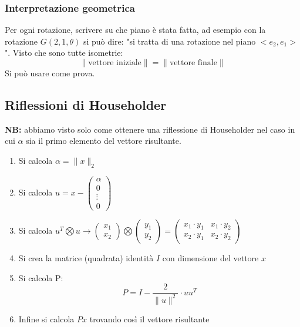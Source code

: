 \documentclass[10pt]{article}
\begin{document}
\subsubsection{Interpretazione geometrica}
Per ogni rotazione, scrivere su che piano è stata fatta, ad esempio con la rotazione $G(2,1,\theta)$ si può dire: "si tratta di una rotazione nel piano $<e_{2},e_{1}>$". Visto che sono tutte isometrie: \begin{equation*}
    \lVert \text{vettore iniziale} \rVert = \lVert \text{vettore finale} \rVert
\end{equation*}
Si può usare come prova.
\subsection{Riflessioni di Householder}
\textbf{NB:} abbiamo visto solo come ottenere una riflessione di Householder nel caso in cui $\alpha$ sia il primo elemento del vettore risultante.
\begin{enumerate}
    \item Si calcola $\alpha=\lVert x\rVert_{2}$
    \item Si calcola $u=x-\begin{pmatrix}
        \alpha \\ 0 \\ \vdots \\ 0
    \end{pmatrix}$
    \item Si calcola $u^{T}\bigotimes u \rightarrow \begin{pmatrix}
        x_{1} \\ x_{2}
    \end{pmatrix}\bigotimes\begin{pmatrix}
        y_{1} \\ y_{2}
    \end{pmatrix}=\begin{pmatrix}
        x_{1}\cdot y_{1} & x_{1}\cdot y_{2} \\
        x_{2}\cdot y_{1} & x_{2}\cdot y_{2}
    \end{pmatrix}$
    \item Si crea la matrice (quadrata) identità $I$ con dimensione del vettore $x$ 
    \item Si calcola P: \begin{equation*}
        P = I-\frac{2}{\lVert u\rVert^{2}}\cdot uu^{T}
    \end{equation*}
    \item Infine si calcola $Px$ trovando così il vettore risultante
\end{enumerate}
\end{document}
